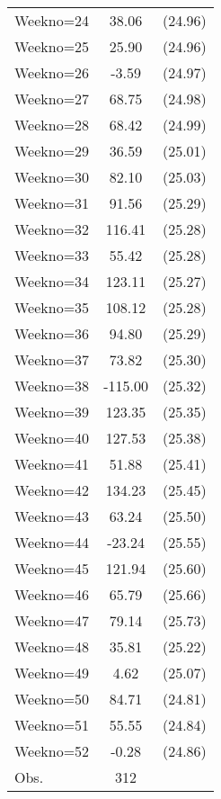{\begin{tabular}{l*{1}{cc}}
Weekno=24       &    38.06&  (24.96)\\
Weekno=25       &    25.90&  (24.96)\\
Weekno=26       &    -3.59&  (24.97)\\
Weekno=27       &    68.75&  (24.98)\\
Weekno=28       &    68.42&  (24.99)\\
Weekno=29       &    36.59&  (25.01)\\
Weekno=30       &    82.10&  (25.03)\\
Weekno=31       &    91.56&  (25.29)\\
Weekno=32       &   116.41&  (25.28)\\
Weekno=33       &    55.42&  (25.28)\\
Weekno=34       &   123.11&  (25.27)\\
Weekno=35       &   108.12&  (25.28)\\
Weekno=36       &    94.80&  (25.29)\\
Weekno=37       &    73.82&  (25.30)\\
Weekno=38       &  -115.00&  (25.32)\\
Weekno=39       &   123.35&  (25.35)\\
Weekno=40       &   127.53&  (25.38)\\
Weekno=41       &    51.88&  (25.41)\\
Weekno=42       &   134.23&  (25.45)\\
Weekno=43       &    63.24&  (25.50)\\
Weekno=44       &   -23.24&  (25.55)\\
Weekno=45       &   121.94&  (25.60)\\
Weekno=46       &    65.79&  (25.66)\\
Weekno=47       &    79.14&  (25.73)\\
Weekno=48       &    35.81&  (25.22)\\
Weekno=49       &     4.62&  (25.07)\\
Weekno=50       &    84.71&  (24.81)\\
Weekno=51       &    55.55&  (24.84)\\
Weekno=52       &    -0.28&  (24.86)\\
\hline
Obs.            &      312&         \\
\hline\hline
\end{tabular}
}
